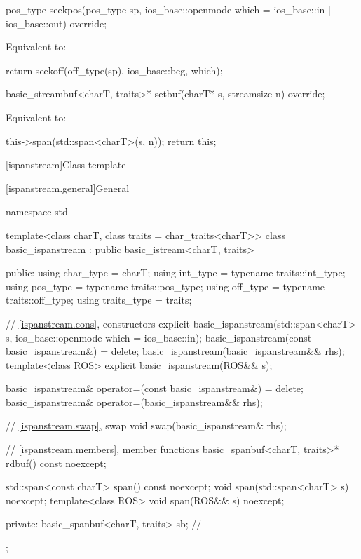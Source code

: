 %
\begin{itemdecl}
pos_type seekpos(pos_type sp, ios_base::openmode which = ios_base::in | ios_base::out) override;
\end{itemdecl}

\begin{itemdescr}
\pnum
\effects
Equivalent to:
\begin{codeblock}
return seekoff(off_type(sp), ios_base::beg, which);
\end{codeblock}
\end{itemdescr}

%
\begin{itemdecl}
basic_streambuf<charT, traits>* setbuf(charT* s, streamsize n) override;
\end{itemdecl}

\begin{itemdescr}
\pnum
\effects
Equivalent to:
\begin{codeblock}
this->span(std::span<charT>(s, n));
return this;
\end{codeblock}
\end{itemdescr}

[ispanstream]{Class template }

[ispanstream.general]{General}

%
\begin{codeblock}
namespace std {
  template<class charT, class traits = char_traits<charT>>
  class basic_ispanstream
    : public basic_istream<charT, traits> {
  public:
    using char_type   = charT;
    using int_type    = typename traits::int_type;
    using pos_type    = typename traits::pos_type;
    using off_type    = typename traits::off_type;
    using traits_type = traits;

    // \ref{ispanstream.cons}, constructors
    explicit basic_ispanstream(std::span<charT> s,
                               ios_base::openmode which = ios_base::in);
    basic_ispanstream(const basic_ispanstream&) = delete;
    basic_ispanstream(basic_ispanstream&& rhs);
    template<class ROS> explicit basic_ispanstream(ROS&& s);

    basic_ispanstream& operator=(const basic_ispanstream&) = delete;
    basic_ispanstream& operator=(basic_ispanstream&& rhs);

    // \ref{ispanstream.swap}, swap
    void swap(basic_ispanstream& rhs);

    // \ref{ispanstream.members}, member functions
    basic_spanbuf<charT, traits>* rdbuf() const noexcept;

    std::span<const charT> span() const noexcept;
    void span(std::span<charT> s) noexcept;
    template<class ROS> void span(ROS&& s) noexcept;

  private:
    basic_spanbuf<charT, traits> sb;    // \expos
  };
}
\end{codeblock}

